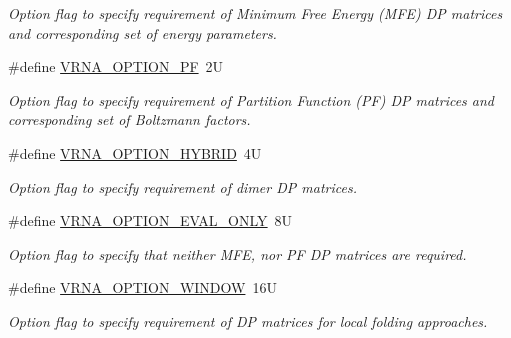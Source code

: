 \begin{DoxyCompactItemize}
\begin{DoxyCompactList}\small\item\em Option flag to specify requirement of Minimum Free Energy (M\+FE) DP matrices and corresponding set of energy parameters. \end{DoxyCompactList}\item 
\#define \hyperlink{group__fold__compound_gabfbadcddda3e74ce7f49035ef8f058f7}{V\+R\+N\+A\+\_\+\+O\+P\+T\+I\+O\+N\+\_\+\+PF}~2U
\begin{DoxyCompactList}\small\item\em Option flag to specify requirement of Partition Function (PF) DP matrices and corresponding set of Boltzmann factors. \end{DoxyCompactList}\item 
\mbox{\label{group__fold__compound_ga8f681fa12b8d4b348bf58415fd1fc82f}} 
\#define \hyperlink{group__fold__compound_ga8f681fa12b8d4b348bf58415fd1fc82f}{V\+R\+N\+A\+\_\+\+O\+P\+T\+I\+O\+N\+\_\+\+H\+Y\+B\+R\+ID}~4U
\begin{DoxyCompactList}\small\item\em Option flag to specify requirement of dimer DP matrices. \end{DoxyCompactList}\item 
\#define \hyperlink{group__fold__compound_ga61469c423131552c8483229f8b6c7e0e}{V\+R\+N\+A\+\_\+\+O\+P\+T\+I\+O\+N\+\_\+\+E\+V\+A\+L\+\_\+\+O\+N\+LY}~8U
\begin{DoxyCompactList}\small\item\em Option flag to specify that neither M\+FE, nor PF DP matrices are required. \end{DoxyCompactList}\item 
\mbox{\label{group__fold__compound_ga2b2a8009ccdccc3eb1571556261aee8e}} 
\#define \hyperlink{group__fold__compound_ga2b2a8009ccdccc3eb1571556261aee8e}{V\+R\+N\+A\+\_\+\+O\+P\+T\+I\+O\+N\+\_\+\+W\+I\+N\+D\+OW}~16U
\begin{DoxyCompactList}\small\item\em Option flag to specify requirement of DP matrices for local folding approaches. \end{DoxyCompactList}\end{DoxyCompactItemize}
